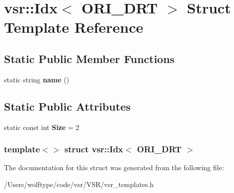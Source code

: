 \hypertarget{structvsr_1_1_idx_3_01_o_r_i___d_r_t_01_4}{\section{vsr\-:\-:Idx$<$ O\-R\-I\-\_\-\-D\-R\-T $>$ Struct Template Reference}
\label{structvsr_1_1_idx_3_01_o_r_i___d_r_t_01_4}
}
\subsection*{Static Public Member Functions}
\begin{DoxyCompactItemize}
\item 
\hypertarget{structvsr_1_1_idx_3_01_o_r_i___d_r_t_01_4_a42c2044ff906717c740e8f9fd18504f4}{static string {\bfseries name} ()}\label{structvsr_1_1_idx_3_01_o_r_i___d_r_t_01_4_a42c2044ff906717c740e8f9fd18504f4}

\end{DoxyCompactItemize}
\subsection*{Static Public Attributes}
\begin{DoxyCompactItemize}
\item 
\hypertarget{structvsr_1_1_idx_3_01_o_r_i___d_r_t_01_4_a67ec0d676d83f62a35142bbfc5970874}{static const int {\bfseries Size} = 2}\label{structvsr_1_1_idx_3_01_o_r_i___d_r_t_01_4_a67ec0d676d83f62a35142bbfc5970874}

\end{DoxyCompactItemize}
\subsubsection*{template$<$$>$ struct vsr\-::\-Idx$<$ O\-R\-I\-\_\-\-D\-R\-T $>$}



The documentation for this struct was generated from the following file\-:\begin{DoxyCompactItemize}
\item 
/\-Users/wolftype/code/vsr/\-V\-S\-R/vsr\-\_\-templates.\-h\end{DoxyCompactItemize}
